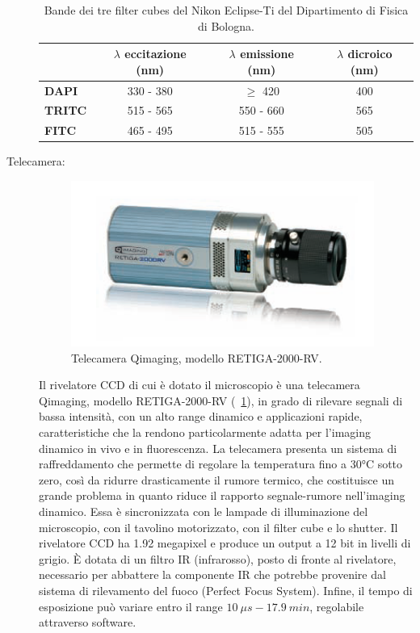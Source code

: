 \begin{description}
\begin{table}[!ht]
 \begin{center}
\begin{small}
\begin{tabular}{lccc}
\hline\hline
&\textbf{$\lambda$ eccitazione (nm)}&\textbf{$\lambda$ emissione (nm)}&\textbf{$\lambda$ dicroico (nm)}\\
\hline
\textbf{DAPI}&330 - 380&$\geq$ 420&400\\
\textbf{TRITC}&515 - 565&550 - 660&565\\
\textbf{FITC}&465 - 495&515 - 555&505\\
\hline\hline
\end{tabular}
\caption{\small{Bande dei tre filter cubes del Nikon Eclipse-Ti del Dipartimento di Fisica di Bologna.}}
\label{TAB}
\end{small}
\end{center}
\end{table}

\item[Telecamera:]

\begin{figure}
 \centering
 \includegraphics[scale=.60]{img/CAP2CCD.png}
 \caption{\small{Telecamera Qimaging, modello RETIGA-2000-RV.}}
 \label{fig:CCD}
\end{figure}

Il rivelatore CCD di cui è dotato il microscopio è una telecamera Qimaging, modello RETIGA-2000-RV (\figurename~\ref{fig:CCD}), in grado di rilevare segnali di bassa intensità, con un alto range dinamico e applicazioni rapide, caratteristiche che la rendono particolarmente adatta per l'imaging dinamico in vivo e in fluorescenza.
La telecamera presenta un sistema di raffreddamento che permette di regolare la temperatura fino a 30°C sotto zero, così da ridurre drasticamente il rumore termico, che costituisce un grande problema in quanto riduce il rapporto segnale-rumore nell'imaging dinamico.
Essa è sincronizzata con le lampade di illuminazione del microscopio, con il tavolino motorizzato, con il filter cube e lo shutter. 
Il rivelatore CCD ha 1.92 megapixel e produce un output a 12 bit in livelli di grigio.
È dotata di un filtro IR (infrarosso), posto di fronte al rivelatore, necessario per abbattere la componente IR che potrebbe provenire dal sistema di rilevamento del fuoco (Perfect Focus System). 
Infine, il tempo di esposizione può variare entro il range $10\ \mu s - 17.9\ min $, regolabile attraverso software.


\end{description}
